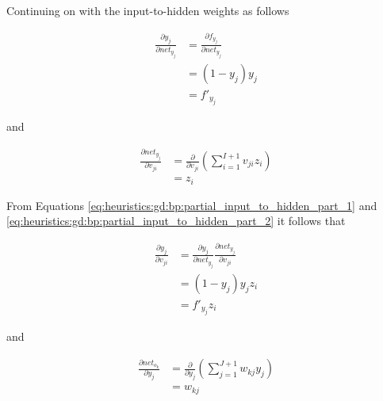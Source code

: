 Continuing on with the input-to-hidden weights as follows

\begin{equation}
    \label{eq:heuristics:gd:bp:partial_input_to_hidden_part_1}
    \begin{split}
        \frac{\partial y_{j}}{\partial net_{y_{j}}}
        &= \frac{\partial f_{y_{j}}}{\partial net_{y_{j}}}\\
        &= (1 - y_{j})y_{j}\\
        &= f'_{y_{j}}
    \end{split}
\end{equation}

and

\begin{equation}
    \label{eq:heuristics:gd:bp:partial_input_to_hidden_part_2}
    \begin{split}
        \frac{\partial net_{y_{j}}}{\partial v_{ji}}
        &= \frac{\partial}{\partial v_{ji}}\left( \sum^{I+1}_{i=1}v_{ji}z_{i}\right)\\
        &= z_{i}
    \end{split}
\end{equation}


From Equations \ref{eq:heuristics:gd:bp:partial_input_to_hidden_part_1} and \ref{eq:heuristics:gd:bp:partial_input_to_hidden_part_2} it follows that

\begin{equation}
    \label{eq:heuristics:gd:bp:partial_input_to_hidden_part_3}
    \begin{split}
        \frac{\partial y_{j}}{\partial v_{ji}}
        &= \frac{\partial y_{j}}{\partial net_{y_{j}}}\frac{\partial net_{y_{j}}}{\partial v_{ji}}\\
        &= (1 - y_{j})y_{j}z_{i}\\
        &= f'_{y_{j}}z_{i}
    \end{split}
\end{equation}

and

\begin{equation}
    \label{eq:heuristics:gd:bp:partial_input_to_hidden_part_4}
    \begin{split}
        \frac{\partial net_{o_{k}}}{\partial y_{j}}
        &= \frac{\partial}{\partial y_{j}}\left( \sum^{J+1}_{j=1}w_{kj}y_{j}\right)\\
        &= w_{kj}
    \end{split}
\end{equation}

